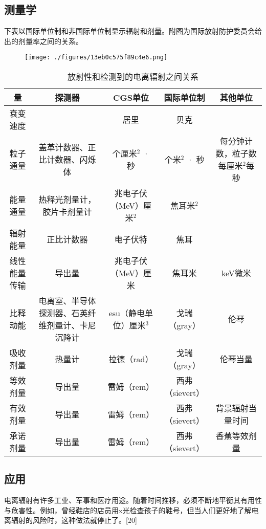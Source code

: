 \subsection{测量学}
下表以国际单位制和非国际单位制显示辐射和剂量。附图为国际放射防护委员会给出的剂量率之间的关系。
\begin{figure}[ht]
\centering
\texttt{[image: ./figures/13eb0c575f89c4e6.png]}
\caption\label{fig_DLFS_7}
\end{figure}

\begin{table}[ht]
\centering
\caption{放射性和检测到的电离辐射之间关系}\label{DLFS}
\begin{tabular}{|c|c|c|c|c}
\hline
\textbf{量} & \textbf{探测器} & \textbf{CGS单位} & \textbf{国际单位制} & \textbf{其他单位} \\
\hline
衰变速度 &  & 居里 & 贝克 &  \\
\hline
粒子通量 & 盖革计数器、正比计数器、闪烁体 & 个厘米$^{2}$ · 秒 & 个米$^{2}$ · 秒 & 每分钟计数，粒子数每厘米$^{2}$每秒\\
\hline
能量通量 & 热释光剂量计，胶片卡剂量计 & 兆电子伏（MeV）厘米$^{2}$ & 焦耳米$^{2}$ &  \\
\hline
辐射能量 & 正比计数器 & 电子伏特 & 焦耳 & \\
\hline
线性能量传输 & 导出量 & 兆电子伏（MeV）厘米 & 焦耳米 & keV微米 \\
\hline
比释动能 & 电离室、半导体探测器、石英纤维剂量计、卡尼沉降计 & esu（静电单位）厘米$^{3}$ & 戈瑞（gray） & 伦琴\\
\hline
吸收剂量 & 热量计 & 拉德（rad） & 戈瑞（gray） & 伦琴当量\\
\hline
等效剂量 & 导出量 & 雷姆（rem） & 西弗（sievert） & \\
\hline
有效剂量 & 导出量 & 雷姆（rem） & 西弗（sievert） & 背景辐射当量时间\\
\hline
承诺剂量 & 导出量 & 雷姆（rem） & 西弗（sievert） & 香蕉等效剂量\\
\hline
\end{tabular}
\end{table}

\subsection{应用}
电离辐射有许多工业、军事和医疗用途。随着时间推移，必须不断地平衡其有用性与危害性。例如，曾经鞋店的店员用x光检查孩子的鞋号，但当人们更好地了解电离辐射的风险时，这种做法就停止了。[20]

